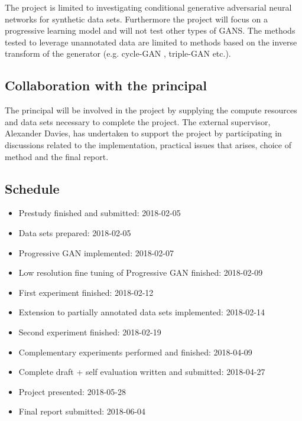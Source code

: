 \documentclass[a4paper]{article}
\begin{document}
The project is limited to investigating conditional generative adversarial neural networks for synthetic data sets. Furthermore the project will focus on a progressive learning model and will not test other types of GANS. The methods tested to leverage unannotated data are limited to methods based on the inverse transform of the generator (e.g. cycle-GAN \cite{zhu2017unpaired}, triple-GAN\cite{li2017triple} etc.). 

\subsection{Collaboration with the principal}
The principal will be involved in the project by supplying the compute resources and data sets necessary to complete the project. The external supervisor, Alexander Davies, has undertaken to support the project by participating in discussions related to the implementation, practical issues that arises, choice of method and the final report. 

\subsection{Schedule}
\begin{itemize}
\item Prestudy finished and submitted: 2018-02-05
\item Data sets prepared: 2018-02-05
\item Progressive GAN implemented: 2018-02-07
\item Low resolution fine tuning of Progressive GAN finished: 2018-02-09
\item First experiment finished: 2018-02-12 
\item Extension to partially annotated data sets implemented: 2018-02-14
\item Second experiment finished: 2018-02-19
\item Complementary experiments performed and finished: 2018-04-09
\item Complete draft + self evaluation written and submitted: 2018-04-27
\item Project presented: 2018-05-28
\item Final report submitted: 2018-06-04
\end{itemize}



\end{document}
